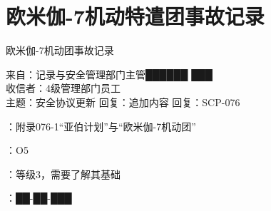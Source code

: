 \chapter{欧米伽-7机动特遣团事故记录}

\label{chap:DOC-scp-076-2}

欧米伽-7机动团事故记录

\begin{scpbox}

来自：记录与安全管理部门主管██████ ███\\
收信者：4级管理部门员工\\
主题：安全协议更新 回复：追加内容 回复：SCP-076

：附录076-1“亚伯计划”与“欧米伽-7机动团”

：O5

：等级3，需要了解其基础

：██-██-███

\end{scpbox}

\hr


